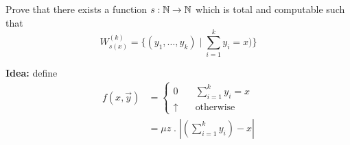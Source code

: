 \begin{exercise}
  Prove that there exists a function $s: \mathbb{N} \to \mathbb{N}$ which is total and computable
  such that
  \[W_{s(x)}^{(k)} = \{(y_1, \dots, y_k) \; | \;
    \sum\limits_{i=1}^ky_i = x)\}\]

  \textbf{Idea:} define
  \begin{align*}
    f(x, \vec{y}) &=
      \begin{cases}
        0 & \quad \sum_{i=1}^ky_i = x \\
        \uparrow & \quad \mbox{otherwise}
      \end{cases} \\
      &= \mu z \; . \; \left|\left(\sum_{i=1}^ky_i\right) - x\right|
  \end{align*}
\end{exercise}
